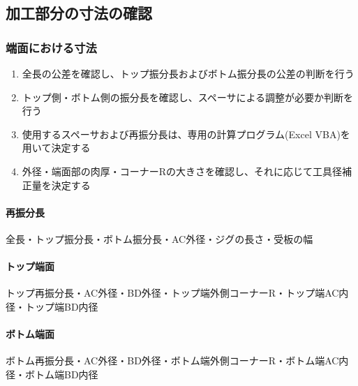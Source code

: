 \subsection{加工部分の寸法の確認}

\subsubsection{端面における寸法}
\begin{enumerate}
\item {}全長の公差を確認し、トップ振分長およびボトム振分長の公差の判断を行う
\item トップ側・ボトム側の振分長を確認し、スペーサによる調整が必要か判断を行う
\item 使用するスペーサおよび再振分長は、専用の計算プログラム(Excel VBA)を用いて決定する
\item 外径・端面部の肉厚・コーナーRの大きさを確認し、それに応じて工具径補正量を決定する
\end{enumerate}
\begin{Tabbox}[title={必要な図面上のパラメータ}]\small
\paragraph*{再振分長}
全長・トップ振分長・ボトム振分長・AC外径・ジグの長さ・受板の幅
\tcbline*
\paragraph*{トップ端面}
トップ再振分長・AC外径・BD外径・トップ端外側コーナーR・トップ端AC内径・トップ端BD内径
\tcbline*
\paragraph*{ボトム端面}
ボトム再振分長・AC外径・BD外径・ボトム端外側コーナーR・ボトム端AC内径・ボトム端BD内径
\end{Tabbox}

